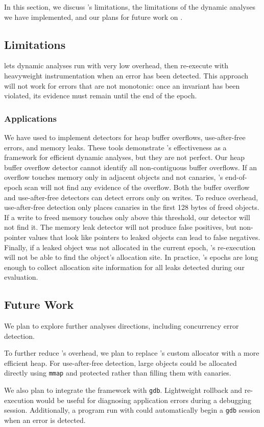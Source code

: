 In this section, we discuss \doubletake{}'s limitations, the limitations of the dynamic analyses we have implemented, and our plans for future work on \doubletake{}.

\subsection{Limitations}

\doubletake{} lets dynamic analyses run with very low overhead, then
re-execute with heavyweight instrumentation when an error has been
detected. This approach will not work for errors that are not
monotonic: once an invariant has been violated, its evidence must
remain until the end of the epoch.

\subsubsection*{Applications}
We have used \doubletake{} to implement detectors for heap buffer
overflows, use-after-free errors, and memory leaks. These tools
demonstrate \doubletake{}'s effectiveness as a framework for efficient
dynamic analyses, but they are not perfect. Our heap buffer overflow
detector cannot identify all non-contiguous buffer overflows. If an
overflow touches memory only in adjacent objects and not
canaries, \doubletake{}'s end-of-epoch scan will not find any evidence
of the overflow. Both the buffer overflow and use-after-free detectors
can detect errors only on writes. To reduce overhead, use-after-free
detection only places canaries in the first 128 bytes of freed
objects. If a write to freed memory touches only above this threshold,
our detector will not find it. The memory leak detector will not
produce false positives, but non-pointer values that look like
pointers to leaked objects can lead to false negatives. Finally, if a
leaked object was not allocated in the current epoch, \doubletake{}'s
re-execution will not be able to find the object's allocation site. In
practice, \doubletake{}'s epochs are long enough to collect allocation
site information for all leaks detected during our evaluation.
 
\subsection{Future Work}
We plan to explore further analyses directions, including concurrency error detection.

To further reduce \doubletake{}'s overhead, we plan to
replace \doubletake{}'s custom allocator with a more efficient
heap. For use-after-free detection, large objects could be allocated
directly using \texttt{mmap} and protected rather than filling them
with canaries.

We also plan to integrate the \doubletake{} framework
with \texttt{gdb}. Lightweight rollback and re-execution would be
useful for diagnosing application errors during a debugging
session. Additionally, a program run with \doubletake{} could
automatically begin a \texttt{gdb} session when an error is detected.
